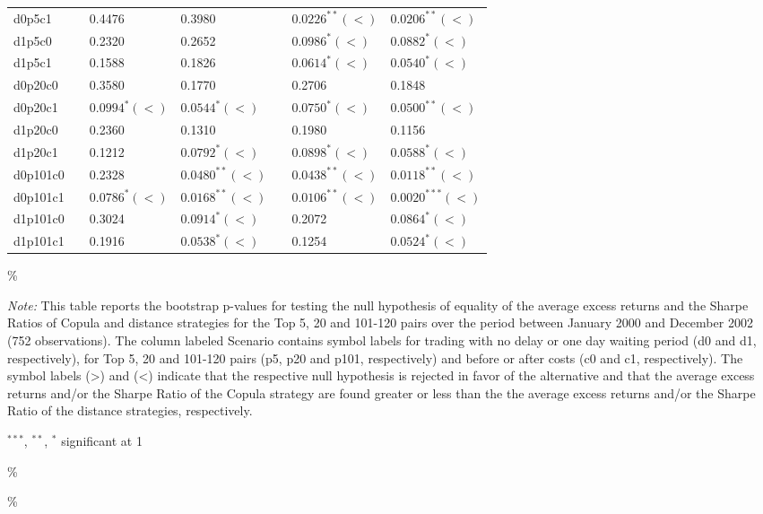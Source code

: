 \documentclass[a4paper]{article}
\begin{document}
\begin{threeparttable}[H]
\begin{tabularx}{\textwidth}{@{\extracolsep{\fill}}lllllll@{}}
			d0p5c1 & & 0.4476 & 0.3980 &       & $0.0226^{**}(<)$ & $0.0206^{**}(<)$ \\
			d1p5c0 & & 0.2320 & 0.2652 &       & $0.0986^{*}(<)$ & $0.0882^{*}(<)$ \\
			d1p5c1 & & 0.1588 & 0.1826 &       & $0.0614^{*}(<)$ & $0.0540^{*}(<)$ \\
			d0p20c0 & & 0.3580 & 0.1770 &       & 0.2706 & 0.1848 \\
			d0p20c1 & & $0.0994^{*}(<)$ & $0.0544^{*}(<)$ &       & $0.0750^{*}(<)$ & $0.0500^{**}(<)$ \\
			d1p20c0 & & 0.2360 & 0.1310 &       & 0.1980 & 0.1156 \\
			d1p20c1 & & 0.1212 & $0.0792^{*}(<)$ &       & $0.0898^{*}(<)$ & $0.0588^{*}(<)$ \\
			d0p101c0 & & 0.2328 & $0.0480^{**}(<)$ &       & $0.0438^{**}(<)$ & $0.0118^{**}(<)$ \\
			d0p101c1 & & $0.0786^{*}(<)$ & $0.0168^{**}(<)$ &       & $0.0106^{**}(<)$ & $0.0020^{***}(<)$ \\
			d1p101c0 & & 0.3024 & $0.0914^{*}(<)$ &       & 0.2072 & $0.0864^{*}(<)$ \\
			d1p101c1 & & 0.1916 & $0.0538^{*}(<)$ &       & 0.1254 & $0.0524^{*}(<)$ \\
			\bottomrule
		\end{tabularx}\%
		\begin{tablenotes}
			\item \textit{Note:} \scriptsize This table reports the bootstrap p-values for testing the null hypothesis of equality of the average excess returns and the Sharpe Ratios of Copula and distance strategies for the Top 5, 20 and 101-120 pairs over the period between January 2000 and December 2002 (752 observations). The column labeled Scenario contains symbol labels for trading with no delay or one day waiting period (d0 and d1, respectively), for Top 5, 20 and 101-120 pairs (p5, p20 and p101, respectively) and before or after costs (c0 and c1, respectively). The symbol labels (>) and (<) indicate that the respective null hypothesis is rejected in favor of the alternative and that the average excess returns and/or the Sharpe Ratio of the Copula strategy are found greater or less than the the average excess returns and/or the Sharpe Ratio of the distance strategies, respectively.
			\item \scriptsize $^{\ast\ast\ast}$, $^{\ast\ast}$, $^{\ast}$  significant at 1\\%
		\end{tablenotes}
		\label{tab:table122}\%
	\end{threeparttable}\%
	
\end{document}
